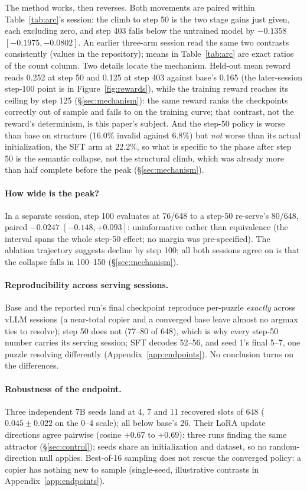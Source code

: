 \documentclass{article}
\begin{document}
The method works, then reverses. Both movements are paired within
Table~\ref{tab:arc}'s session: the climb to step 50 is the two stage gains
just given, each excluding zero, and step 403 falls below the untrained
model by $-0.1358$ $[-0.1975, -0.0802]$. An earlier three-arm session read the same two contrasts consistently (values in the repository); means in Table~\ref{tab:arc} are exact ratios of the count column. Two details locate the
mechanism. Held-out mean reward reads 0.252 at step 50 and 0.125 at step 403 against base's 0.165 (the later-session step-100 point is in Figure~\ref{fig:rewards}), while the training reward reaches its ceiling by step 125
(\S\ref{sec:mechanism}): the same reward ranks the checkpoints correctly
out of sample and fails to on the training curve; that contrast, not
the reward's determinism, is this paper's subject. And
the step-50 policy is worse than base on structure (16.0\% invalid against
6.8\%) but \emph{not} worse than its actual initialization, the SFT arm at
22.2\%, so what is specific to the phase after step 50 is the semantic
collapse, not the structural climb, which was already more than half
complete before the peak (\S\ref{sec:mechanism}).

\paragraph{How wide is the peak?} In a separate session, step 100 evaluates at 76/648 to a step-50 re-serve's 80/648, paired $-0.0247$ $[-0.148, +0.093]$: uninformative rather than equivalence (the interval spans the whole step-50 effect; no margin was pre-specified). The ablation trajectory suggests decline by step 100; all both sessions agree on is that the collapse falls in 100--150 (\S\ref{sec:mechanism}).

\paragraph{Reproducibility across serving sessions.} Base and the reported run's final checkpoint reproduce per-puzzle \emph{exactly} across vLLM sessions (a near-total copier and a converged base leave almost no argmax ties to resolve); step 50 does not (77--80 of 648), which is why every step-50 number carries its serving session; SFT decodes 52--56, and seed 1's final 5--7, one puzzle resolving differently (Appendix~\ref{app:endpoints}). No conclusion turns on the differences.

\paragraph{Robustness of the endpoint.} Three independent 7B seeds land at
4, 7 and 11 recovered slots of 648 ($0.045 \pm 0.022$ on the 0--4 scale);
all below base's 26. Their LoRA update directions agree pairwise (cosine $+0.67$ to $+0.69$): three runs finding the same attractor (\S\ref{sec:control}); seeds share an initialization and dataset, so no random-direction null applies. Best-of-16 sampling does not rescue the
converged policy: a copier has nothing new to sample (single-seed,
illustrative contrasts in Appendix~\ref{app:endpoints}).
\end{document}
